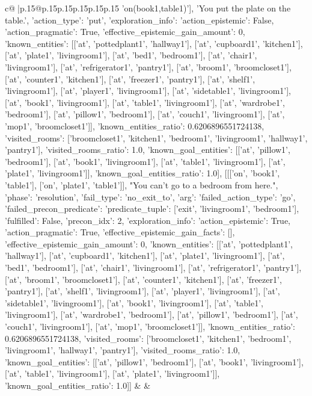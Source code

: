 \documentclass{article}
\begin{document}
{\begin{supertabular}{c@{$\;$}|p{.15\linewidth}@{}p{.15\linewidth}p{.15\linewidth}p{.15\linewidth}p{.15\linewidth}p{.15\linewidth}}
{{{'on(book1,table1)'], 'You put the plate on the table.', {'action_type': 'put', 'exploration_info': {'action_epistemic': False, 'action_pragmatic': True, 'effective_epistemic_gain_amount': 0, 'known_entities': [['at', 'pottedplant1', 'hallway1'], ['at', 'cupboard1', 'kitchen1'], ['at', 'plate1', 'livingroom1'], ['at', 'bed1', 'bedroom1'], ['at', 'chair1', 'livingroom1'], ['at', 'refrigerator1', 'pantry1'], ['at', 'broom1', 'broomcloset1'], ['at', 'counter1', 'kitchen1'], ['at', 'freezer1', 'pantry1'], ['at', 'shelf1', 'livingroom1'], ['at', 'player1', 'livingroom1'], ['at', 'sidetable1', 'livingroom1'], ['at', 'book1', 'livingroom1'], ['at', 'table1', 'livingroom1'], ['at', 'wardrobe1', 'bedroom1'], ['at', 'pillow1', 'bedroom1'], ['at', 'couch1', 'livingroom1'], ['at', 'mop1', 'broomcloset1']], 'known_entities_ratio': 0.6206896551724138, 'visited_rooms': ['broomcloset1', 'kitchen1', 'bedroom1', 'livingroom1', 'hallway1', 'pantry1'], 'visited_rooms_ratio': 1.0, 'known_goal_entities': [['at', 'pillow1', 'bedroom1'], ['at', 'book1', 'livingroom1'], ['at', 'table1', 'livingroom1'], ['at', 'plate1', 'livingroom1']], 'known_goal_entities_ratio': 1.0}}], [[['on', 'book1', 'table1'], ['on', 'plate1', 'table1']], "You can't go to a bedroom from here.", {'phase': 'resolution', 'fail_type': 'no_exit_to', 'arg': {'failed_action_type': 'go', 'failed_precon_predicate': {'predicate_tuple': ['exit', 'livingroom1', 'bedroom1'], 'fulfilled': False, 'precon_idx': 2}}, 'exploration_info': {'action_epistemic': True, 'action_pragmatic': True, 'effective_epistemic_gain_facts': [], 'effective_epistemic_gain_amount': 0, 'known_entities': [['at', 'pottedplant1', 'hallway1'], ['at', 'cupboard1', 'kitchen1'], ['at', 'plate1', 'livingroom1'], ['at', 'bed1', 'bedroom1'], ['at', 'chair1', 'livingroom1'], ['at', 'refrigerator1', 'pantry1'], ['at', 'broom1', 'broomcloset1'], ['at', 'counter1', 'kitchen1'], ['at', 'freezer1', 'pantry1'], ['at', 'shelf1', 'livingroom1'], ['at', 'player1', 'livingroom1'], ['at', 'sidetable1', 'livingroom1'], ['at', 'book1', 'livingroom1'], ['at', 'table1', 'livingroom1'], ['at', 'wardrobe1', 'bedroom1'], ['at', 'pillow1', 'bedroom1'], ['at', 'couch1', 'livingroom1'], ['at', 'mop1', 'broomcloset1']], 'known_entities_ratio': 0.6206896551724138, 'visited_rooms': ['broomcloset1', 'kitchen1', 'bedroom1', 'livingroom1', 'hallway1', 'pantry1'], 'visited_rooms_ratio': 1.0, 'known_goal_entities': [['at', 'pillow1', 'bedroom1'], ['at', 'book1', 'livingroom1'], ['at', 'table1', 'livingroom1'], ['at', 'plate1', 'livingroom1']], 'known_goal_entities_ratio': 1.0}}]] 
	  } 
	   } 
	   } 
	 & & \\ 
 


\end{supertabular}}
\end{document}

